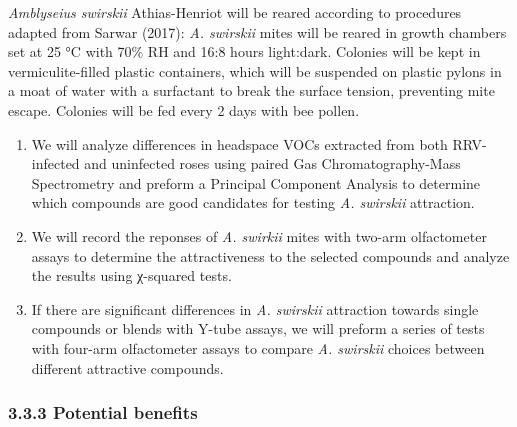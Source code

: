 \documentclass[12pt,final,CPage]{ufthesis}
\begin{document}
{  \emph{Amblyseius swirskii} Athias-Henriot will be reared according to procedures adapted from Sarwar (2017): \emph{A. swirskii} mites will be reared in growth chambers set at 25 °C with 70\% RH and 16:8 hours light:dark. Colonies will be kept in vermiculite-filled plastic containers, which will be suspended on plastic pylons in a moat of water with a surfactant to break the surface tension, preventing mite escape. Colonies will be fed every 2 days with bee pollen.
  \begin{enumerate}
  \def\labelenumi{\arabic{enumi}.}
  \item
    We will analyze differences in headspace VOCs extracted from both RRV-infected and uninfected roses using paired Gas Chromatography-Mass Spectrometry and preform a Principal Component Analysis to determine which compounds are good candidates for testing \emph{A. swirskii} attraction.
  \item
    We will record the reponses of \emph{A. swirkii} mites with two-arm olfactometer assays to determine the attractiveness to the selected compounds and analyze the results using χ-squared tests.
  \item
    If there are significant differences in \emph{A. swirskii} attraction towards single compounds or blends with Y-tube assays, we will preform a series of tests with four-arm olfactometer assays to compare \emph{A. swirskii} choices between different attractive compounds.
  \end{enumerate}
  \hypertarget{potential-benefits-2}{%
  \subsubsection{3.3.3 Potential benefits}\label{potential-benefits-2}}

}
\end{document}
